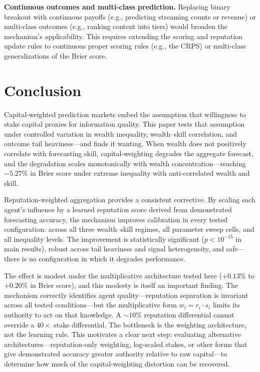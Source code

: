 \documentclass[conference]{IEEEtran}
\begin{document}
\textbf{Continuous outcomes and multi-class prediction.} Replacing binary breakout with continuous payoffs (e.g., predicting streaming counts or revenue) or multi-class outcomes (e.g., ranking content into tiers) would broaden the mechanism's applicability. This requires extending the scoring and reputation update rules to continuous proper scoring rules (e.g., the CRPS) or multi-class generalizations of the Brier score.

\section{Conclusion}
\label{sec:conclusion}

Capital-weighted prediction markets embed the assumption that willingness to stake capital proxies for information quality. This paper tests that assumption under controlled variation in wealth inequality, wealth--skill correlation, and outcome tail heaviness---and finds it wanting. When wealth does not positively correlate with forecasting skill, capital-weighting degrades the aggregate forecast, and the degradation scales monotonically with wealth concentration---reaching $-5.27\%$ in Brier score under extreme inequality with anti-correlated wealth and skill.

Reputation-weighted aggregation provides a consistent corrective. By scaling each agent's influence by a learned reputation score derived from demonstrated forecasting accuracy, the mechanism improves calibration in every tested configuration: across all three wealth--skill regimes, all parameter sweep cells, and all inequality levels. The improvement is statistically significant ($p < 10^{-15}$ in main results), robust across tail heaviness and signal heterogeneity, and safe---there is no configuration in which it degrades performance.

The effect is modest under the multiplicative architecture tested here ($+0.13\%$ to $+0.20\%$ in Brier score), and this modesty is itself an important finding. The mechanism correctly identifies agent quality---reputation separation is invariant across all tested conditions---but the multiplicative form $w_i = r_i \cdot s_i$ limits its authority to act on that knowledge. A ${\sim}10\%$ reputation differential cannot override a $40\times$ stake differential. The bottleneck is the weighting architecture, not the learning rule. This motivates a clear next step: evaluating alternative architectures---reputation-only weighting, log-scaled stakes, or other forms that give demonstrated accuracy greater authority relative to raw capital---to determine how much of the capital-weighting distortion can be recovered.
\end{document}
